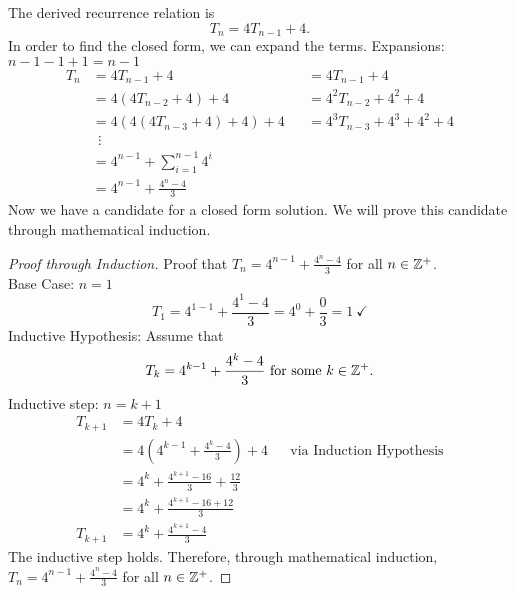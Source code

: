 \documentclass{article}
\begin{document}
The derived recurrence relation is
\[
  T_n = 4T_{n-1} + 4.
\]
In order to find the closed form, we can expand the terms. Expansions: $n-1-1+1 = n-1$
\begin{align*}
  T_n & = 4T_{n-1} + 4                     &  & = 4T_{n-1} + 4               \\
      & = 4(4T_{n-2} + 4) + 4              &  & = 4^2T_{n-2} + 4^2 + 4       \\
      & = 4(4(4T_{n-3} + 4) + 4) + 4       &  & = 4^3T_{n-3} + 4^3 + 4^2 + 4 \\
      & ~~\vdots                                                             \\
      & = 4^{n-1} + \sum_{i = 1}^{n-1} 4^i                                   \\
      & = 4^{n-1} + \frac{4^{n}-4}{3}
\end{align*}
Now we have a candidate for a closed form solution. We will prove this candidate through mathematical induction.
\begin{proof}[Proof through Induction]
  Proof that $T_n = 4^{n-1} + \frac{4^{n}-4}{3}$ for all $n \in \mathbb{Z}^{+}$. \\
  Base Case: $n = 1$
  \[
    T_1 = 4^{1-1} + \frac{4^1-4}{3} = 4^0 + \frac{0}{3} = 1~\checkmark
  \]
  Inductive Hypothesis: Assume that
  \[
    T_k = 4^{k-1} + \frac{4^k-4}{3}~\text{for some}~k \in \mathbb{Z}^{+}.
  \]
  Inductive step: $n = k+1$
  \begin{align*}
    T_{k+1} & = 4T_{k} + 4                                                                       \\
            & = 4(4^{k-1} + \frac{4^k-4}{3}) + 4            &  & \text{via Induction Hypothesis} \\
            & = 4^{k} + \frac{4^{k+1}-16}{3} + \frac{12}{3}                                      \\
            & = 4^{k} + \frac{4^{k+1}-16 + 12}{3}                                                \\
    T_{k+1} & = 4^{k} + \frac{4^{k+1}-4}{3}
  \end{align*}
  The inductive step holds. Therefore, through mathematical induction, $T_n = 4^{n-1} + \frac{4^{n}-4}{3}$ for all $n \in \mathbb{Z}^{+}$.
\end{proof}
\qdash
\end{document}
